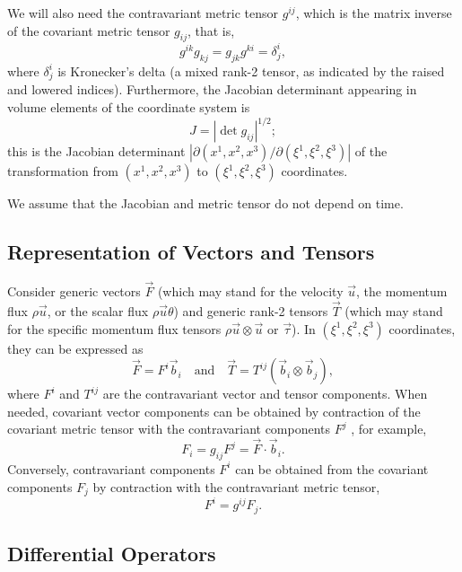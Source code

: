 \documentclass{report}
\begin{document}
We will also need the contravariant metric tensor $g^{ij}$, which is the matrix inverse of the covariant metric tensor $g_{ij}$, that is, 
\[
g^{ik} g_{kj} = g_{jk} g^{ki} = \delta^i_j,
\]
where $\delta^i_j$ is Kronecker's delta (a mixed rank-2 tensor, as indicated by the raised and lowered indices). Furthermore, the Jacobian determinant appearing in volume elements of the coordinate system is
\begin{equation}
    J = |\det g_{ij}|^{1/2};
\end{equation}
this is the Jacobian determinant $|\partial (x^1, x^2, x^3)/\partial (\xi^1, \xi^2, \xi^3)|$ of the transformation from $(x^1, x^2, x^3)$ to $(\xi^1, \xi^2, \xi^3)$ coordinates.

We assume that the Jacobian and metric tensor do not depend on time.

\subsection{Representation of Vectors and Tensors}

Consider generic vectors $\vec{F}$ (which may stand for the velocity $\vec{u}$, the momentum flux $\rho \vec{u}$, or the scalar flux $\rho \vec{u} \theta$) and generic rank-2 tensors $\vec{T}$ (which may stand for the specific momentum flux tensors $\rho \vec{u} \otimes \vec{u}$ or $\vec{\tau}$). In $(\xi^1, \xi^2, \xi^3)$ coordinates, they can be expressed as 
\begin{equation}\label{e:contravariant_vectors}
\vec{F} = F^i \vec{b}_i \quad \text{and} \quad \vec{T} = T^{ij} (\vec{b}_i \otimes \vec{b}_j), 
\end{equation}
where $F^i$ and $T^{ij}$ are the contravariant vector and tensor components. When needed, covariant vector components can be obtained by contraction of the covariant metric tensor with the contravariant components $F^j$ , for example,
\begin{equation}\label{e:covariant_components}
 F_i  = g_{ij} F^j = \vec{F} \cdot \vec{b}_i.
\end{equation}
Conversely, contravariant components $F^i$ can be obtained from the covariant components $F_j$ by contraction with the contravariant metric tensor,
\begin{equation}
 F^i  = g^{ij} F_j.
\end{equation}

\subsection{Differential Operators}
\end{document}
